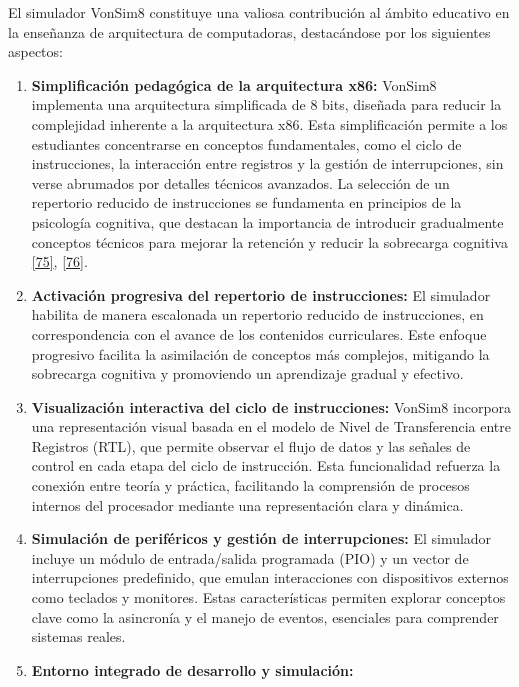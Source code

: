\documentclass[12pt,oneside]{templates/unerthesis}
\begin{document}
El simulador VonSim8 constituye una valiosa contribución al ámbito educativo en la enseñanza de arquitectura de computadoras, destacándose por los siguientes aspectos:

\begin{enumerate}
\def\labelenumi{\arabic{enumi}.}
\item
  \textbf{Simplificación pedagógica de la arquitectura x86:}
  VonSim8 implementa una arquitectura simplificada de 8 bits, diseñada para reducir la complejidad inherente a la arquitectura x86. Esta simplificación permite a los estudiantes concentrarse en conceptos fundamentales, como el ciclo de instrucciones, la interacción entre registros y la gestión de interrupciones, sin verse abrumados por detalles técnicos avanzados. La selección de un repertorio reducido de instrucciones se fundamenta en principios de la psicología cognitiva, que destacan la importancia de introducir gradualmente conceptos técnicos para mejorar la retención y reducir la sobrecarga cognitiva \protect\hyperlink{ref-nationalacademies2018how}{{[}75{]}}, \protect\hyperlink{ref-sweller2010cognitive}{{[}76{]}}.
\item
  \textbf{Activación progresiva del repertorio de instrucciones:}
  El simulador habilita de manera escalonada un repertorio reducido de instrucciones, en correspondencia con el avance de los contenidos curriculares. Este enfoque progresivo facilita la asimilación de conceptos más complejos, mitigando la sobrecarga cognitiva y promoviendo un aprendizaje gradual y efectivo.
\item
  \textbf{Visualización interactiva del ciclo de instrucciones:}
  VonSim8 incorpora una representación visual basada en el modelo de Nivel de Transferencia entre Registros (RTL), que permite observar el flujo de datos y las señales de control en cada etapa del ciclo de instrucción. Esta funcionalidad refuerza la conexión entre teoría y práctica, facilitando la comprensión de procesos internos del procesador mediante una representación clara y dinámica.
\item
  \textbf{Simulación de periféricos y gestión de interrupciones:}
  El simulador incluye un módulo de entrada/salida programada (PIO) y un vector de interrupciones predefinido, que emulan interacciones con dispositivos externos como teclados y monitores. Estas características permiten explorar conceptos clave como la asincronía y el manejo de eventos, esenciales para comprender sistemas reales.
\item
  \textbf{Entorno integrado de desarrollo y simulación:}

\end{enumerate}
\end{document}
